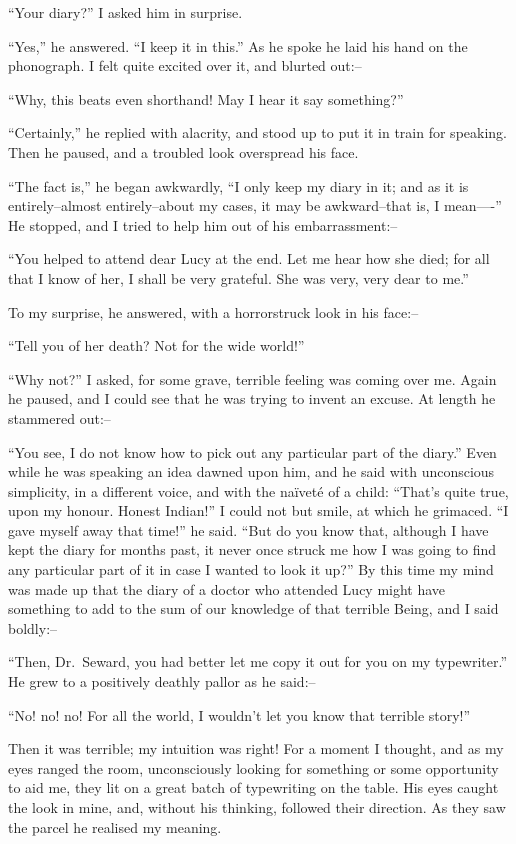 \documentclass[12pt,openright]{book}
\begin{document}
“Your diary?” I asked him in surprise.

“Yes,” he answered. “I keep it in this.” As he spoke he laid his hand on the phonograph. I felt quite excited over it, and blurted out:–

“Why, this beats even shorthand! May I hear it say something?”

“Certainly,” he replied with alacrity, and stood up to put it in train for speaking. Then he paused, and a troubled look overspread his face.

“The fact is,” he began awkwardly, “I only keep my diary in it; and as it is entirely–almost entirely–about my cases, it may be awkward–that is, I mean—-” He stopped, and I tried to help him out of his embarrassment:–

“You helped to attend dear Lucy at the end. Let me hear how she died; for all that I know of her, I shall be very grateful. She was very, very dear to me.”

To my surprise, he answered, with a horrorstruck look in his face:–

“Tell you of her death? Not for the wide world!”

“Why not?” I asked, for some grave, terrible feeling was coming over me. Again he paused, and I could see that he was trying to invent an excuse. At length he stammered out:–

“You see, I do not know how to pick out any particular part of the diary.” Even while he was speaking an idea dawned upon him, and he said with unconscious simplicity, in a different voice, and with the naïveté of a child: “That’s quite true, upon my honour. Honest Indian!” I could not but smile, at which he grimaced. “I gave myself away that time!” he said. “But do you know that, although I have kept the diary for months past, it never once struck me how I was going to find any particular part of it in case I wanted to look it up?” By this time my mind was made up that the diary of a doctor who attended Lucy might have something to add to the sum of our knowledge of that terrible Being, and I said boldly:–

“Then, Dr. Seward, you had better let me copy it out for you on my typewriter.” He grew to a positively deathly pallor as he said:–

“No! no! no! For all the world, I wouldn’t let you know that terrible story!”

Then it was terrible; my intuition was right! For a moment I thought, and as my eyes ranged the room, unconsciously looking for something or some opportunity to aid me, they lit on a great batch of typewriting on the table. His eyes caught the look in mine, and, without his thinking, followed their direction. As they saw the parcel he realised my meaning.
\end{document}
